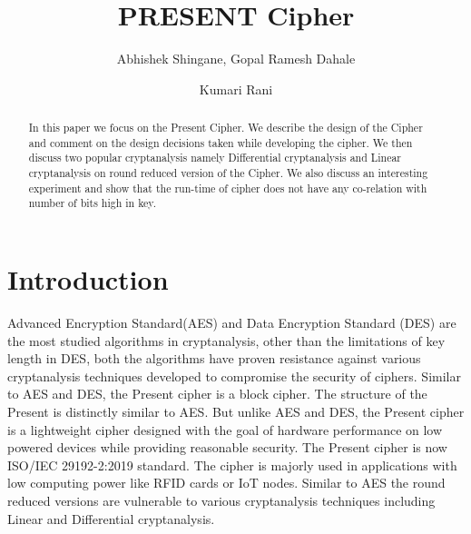 \documentclass[preprint]{transcrypto}
\author{Abhishek Shingane\inst{1}, Gopal Ramesh Dahale\inst{2} \and Kumari Rani\inst{3}}
\institute{
  11840040, IIT Bhilai, \email{abhisheks@iitbhilai.ac.in}
  \and
  11840520, IIT Bhilai, \email{gopald@iitbhilai.ac.in}
  \and
  11840690, IIT Bhilai, \email{krani@iitbhilai.ac.in}\
}
\title{PRESENT Cipher}
\begin{document}
\maketitle


\begin{abstract}
  In this paper we focus on the Present Cipher. We describe the design of the Cipher and comment on the design decisions taken while developing the cipher. We then discuss two popular cryptanalysis namely Differential cryptanalysis  and Linear cryptanalysis on round reduced version of the Cipher. We also discuss an interesting experiment and show that the run-time of cipher does not have any co-relation with number of bits high in key.
\end{abstract}

\section{Introduction}
Advanced Encryption Standard(AES) and Data Encryption Standard (DES) are the most studied algorithms in cryptanalysis, other than the limitations of key length in DES, both the algorithms have proven resistance against various cryptanalysis techniques developed to compromise the security of ciphers. Similar to AES and DES, the Present cipher is a block cipher. The structure of the Present is distinctly similar to AES. But unlike AES and DES, the Present cipher is a lightweight cipher designed with the goal of hardware performance on low powered devices while providing reasonable security. The Present cipher is now ISO/IEC 29192-2:2019 standard. The cipher is majorly used in applications with low computing power like RFID cards or IoT nodes. Similar to AES the round reduced versions are vulnerable to various cryptanalysis techniques including Linear and Differential cryptanalysis.
\end{document}

